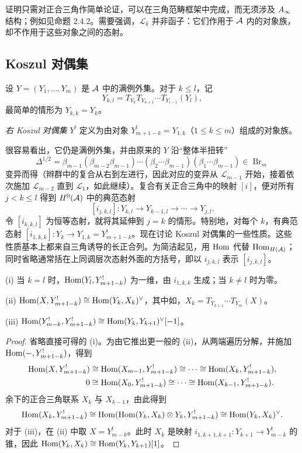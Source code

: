 证明只需对正合三角作简单论证，可以在三角范畴框架中完成，而无须涉及 $A_\infty$ 结构；例如见命题 2.4.2。需要强调，$\mathscr L_k$ 并非函子：它们作用于 $\mathcal A$ 内的对象族，却不作用于这些对象之间的态射。

\subsection{Koszul 对偶集}\label{sec:5k}
设 $Y=(Y_1,\ldots,Y_m)$ 是 $\mathcal A$ 中的满例外集。对于 $k\leq l$，记
\[
Y_{k,l}=T_{Y_k}T_{Y_{k+1}}\cdots T_{Y_{l-1}}(Y_l),
\]
最简单的情形为 $Y_{k,k}=Y_k$。
\begin{definition*}
\emph{右 Koszul 对偶集} $Y^!$ 定义为由对象 $Y^!_{m+1-k}=Y_{1,k}$（$1\leq k\leq m$）组成的对象族。
\end{definition*}
很容易看出，它仍是满例外集，并由原来的 $Y$ 沿“整体半扭转”
\begin{equation}\label{eq:5.25}
\Delta^{1/2}=\beta_{m-1}(\beta_{m-2}\beta_{m-1})\cdots(\beta_2\cdots\beta_{m-1})(\beta_1\cdots\beta_{m-1})\in\operatorname{Br}_m
\end{equation}
变异而得（辫群中的复合从右到左进行，因此对应的变异从 $\mathscr L_{m-1}$ 开始，接着依次施加 $\mathscr L_{m-2}$ 直到 $\mathscr L_1$，如此继续）。复合有关正合三角中的映射 $[i]$，便对所有 $j<k\leq l$ 得到 $H^0(\mathcal A)$ 中的典范态射
\[
[i_{j,k,l}]:Y_{k,l}\longrightarrow Y_{k-1,l}\longrightarrow\cdots\longrightarrow Y_{j,l}.
\]
令 $[i_{k,k,l}]$ 为恒等态射，就将其延伸到 $j=k$ 的情形。特别地，对每个 $k$，有典范态射 $[i_{1,k,k}]:Y_k\to Y_{1,k}=Y^!_{m+1-k}$。现在讨论 Koszul 对偶集的一些性质。这些性质基本上都来自三角诱导的长正合列。为简洁起见，用 $\operatorname{Hom}$ 代替 $\operatorname{Hom}_{H(\mathcal A)}$；同时省略通常括在上同调层次态射外面的方括号，即以 $i_{j,k,l}$ 表示 $[i_{j,k,l}]$。
\begin{lemma}\label{st:5.15}
\textup{(i)} 当 $k=l$ 时，$\operatorname{Hom}(Y_l,Y^!_{m+1-k})$ 为一维，由 $i_{1,k,k}$ 生成；当 $k\ne l$ 时为零。

\textup{(ii)} $\operatorname{Hom}(X,Y^!_{m+1-k})\cong\operatorname{Hom}(Y_k,X_k)^{\vee}$，其中如，$X_k=T_{Y_{k+1}}\cdots T_{Y_m}(X)$。

\textup{(iii)} $\operatorname{Hom}(Y^!_{m-k},Y^!_{m+1-k})\cong\operatorname{Hom}(Y_k,Y_{k+1})^{\vee}[-1]$。
\end{lemma}
\begin{proof}
省略直接可得的 (i)。为由它推出更一般的 (ii)，从两端遍历分解，并施加 $\operatorname{Hom}(-,Y^!_{m+1-k})$，得到
\[
\begin{aligned}
\operatorname{Hom}(X,Y^!_{m+1-k})&\cong\operatorname{Hom}(X_{m-1},Y^!_{m+1-k})\cong\cdots\cong\operatorname{Hom}(X_k,Y^!_{m+1-k}),\\
0&\cong\operatorname{Hom}(X_0,Y^!_{m+1-k})\cong\cdots\cong\operatorname{Hom}(X_{k-1},Y^!_{m+1-k}).
\end{aligned}
\]
余下的正合三角联系 $X_k$ 与 $X_{k-1}$，由此得到
\[
\operatorname{Hom}(X_k,Y^!_{m+1-k})\cong\operatorname{Hom}(\operatorname{Hom}(Y_k,X_k)\otimes Y_k,Y^!_{m+1-k})\cong\operatorname{Hom}(Y_k,X_k)^{\vee}.
\]
对于 (iii)，在 (ii) 中取 $X=Y^!_{m-k}$。此时 $X_k$ 是映射 $i_{1,k+1,k+1}:Y_{k+1}\to Y^!_{m-k}$ 的锥，因此 $\operatorname{Hom}(Y_k,X_k)\cong\operatorname{Hom}(Y_k,Y_{k+1})[1]$。
\end{proof}
